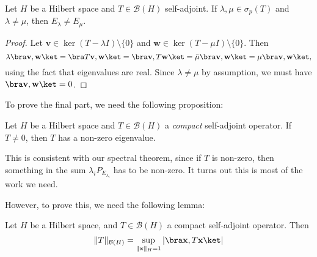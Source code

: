 \documentclass[a4paper]{article}
\begin{document}
\begin{prop}
  Let $H$ be a Hilbert space and $T \in \mathcal{B}(H)$ self-adjoint. If $\lambda, \mu \in \sigma_p(T)$ and $\lambda \not= \mu$, then $E_\lambda \not= E_\mu$.
\end{prop}

\begin{proof}
  Let $\mathbf{v} \in \ker (T - \lambda I)\setminus \{0\}$ and $\mathbf{w} \in \ker(T - \mu I)\setminus \{0\}$. Then
  \[
    \lambda \bra \mathbf{v}, \mathbf{w}\ket = \bra T\mathbf{v}, \mathbf{w}\ket = \bra \mathbf{v}, T \mathbf{w}\ket = \bar{\mu} \bra \mathbf{v}, \mathbf{w}\ket = \mu \bra \mathbf{v}, \mathbf{w}\ket,
  \]
  using the fact that eigenvalues are real. Since $\lambda \not= \mu$ by assumption, we must have $\bra \mathbf{v}, \mathbf{w}\ket = 0$.
\end{proof}

To prove the final part, we need the following proposition:
\begin{prop}
  Let $H$ be a Hilbert space and $T \in \mathcal{B}(H)$ a \emph{compact} self-adjoint operator. If $T \not= 0$, then $T$ has a non-zero eigenvalue.
\end{prop}
This is consistent with our spectral theorem, since if $T$ is non-zero, then something in the sum $\lambda_i P_{E_{\lambda_i}}$ has to be non-zero. It turns out this is most of the work we need.

However, to prove this, we need the following lemma:
\begin{lemma}
  Let $H$ be a Hilbert space, and $T \in \mathcal{B}(H)$ a compact self-adjoint operator. Then
  \[
    \|T\|_{\mathcal{B}(H)} = \sup_{\|\mathbf{x}\|_H = 1} |\bra \mathbf{x}, T \mathbf{x}\ket|
  \]
\end{lemma}
\end{document}
